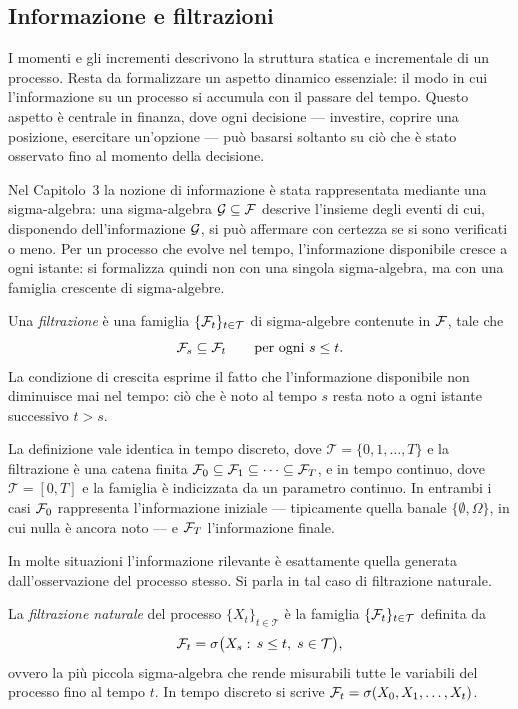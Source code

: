 \subsection{Informazione e filtrazioni}

\noindent
I momenti e gli incrementi descrivono la struttura statica e
incrementale di un processo. Resta da formalizzare un aspetto
dinamico essenziale: il modo in cui l'informazione su un processo si
accumula con il passare del tempo. Questo aspetto \`{e} centrale in
finanza, dove ogni decisione --- investire, coprire una posizione,
esercitare un'opzione --- pu\`{o} basarsi soltanto su ci\`{o} che
\`{e} stato osservato fino al momento della decisione.

Nel Capitolo~3 la nozione di informazione \`{e} stata rappresentata
mediante una sigma-algebra: una sigma-algebra $\mathcal{G}\subseteq\mathcal{F}$ descrive
l'insieme degli eventi di cui, disponendo dell'informazione $\mathcal{G}$, si
pu\`{o} affermare con certezza se si sono verificati o meno. Per un
processo che evolve nel tempo, l'informazione disponibile cresce a
ogni istante: si formalizza quindi non con una singola sigma-algebra,
ma con una famiglia crescente di sigma-algebre.

\begin{definition}
\label{def:filtrazione}
Una \emph{filtrazione} \`{e} una famiglia $\{\mathcal{F}_t\}_{t\in\mathcal{T}}$
di sigma-algebre contenute in $\mathcal{F}$, tale che
\[
\mathcal{F}_s\subseteq\mathcal{F}_t \qquad \text{per ogni } s\leq t.
\]
La condizione di crescita esprime il fatto che l'informazione
disponibile non diminuisce mai nel tempo: ci\`{o} che \`{e} noto al
tempo $s$ resta noto a ogni istante successivo $t>s$.
\end{definition}

La definizione vale identica in tempo discreto, dove
$\mathcal{T}=\{0,1,\ldots,T\}$ e la filtrazione \`{e} una catena
finita $\mathcal{F}_0\subseteq\mathcal{F}_1\subseteq\cdots\subseteq\mathcal{F}_T$, e in tempo
continuo, dove $\mathcal{T}=[0,T]$ e la famiglia \`{e} indicizzata da
un parametro continuo. In entrambi i casi $\mathcal{F}_0$ rappresenta
l'informazione iniziale --- tipicamente quella banale
$\{\emptyset,\Omega\}$, in cui nulla \`{e} ancora noto --- e $\mathcal{F}_T$
l'informazione finale.

In molte situazioni l'informazione rilevante \`{e} esattamente quella
generata dall'osservazione del processo stesso. Si parla in tal caso
di filtrazione naturale.

\begin{definition}
\label{def:filtrazione-naturale}
La \emph{filtrazione naturale} del processo $\{X_t\}_{t\in\mathcal{T}}$
\`{e} la famiglia $\{\mathcal{F}_t\}_{t\in\mathcal{T}}$ definita da
\[
\mathcal{F}_t=\sigma\bigl(X_s:\,s\leq t,\;s\in\mathcal{T}\bigr),
\]
ovvero la pi\`{u} piccola sigma-algebra che rende misurabili tutte le
variabili del processo fino al tempo $t$. In tempo discreto si scrive
$\mathcal{F}_t=\sigma(X_0,X_1,\ldots,X_t)$.
\end{definition}


